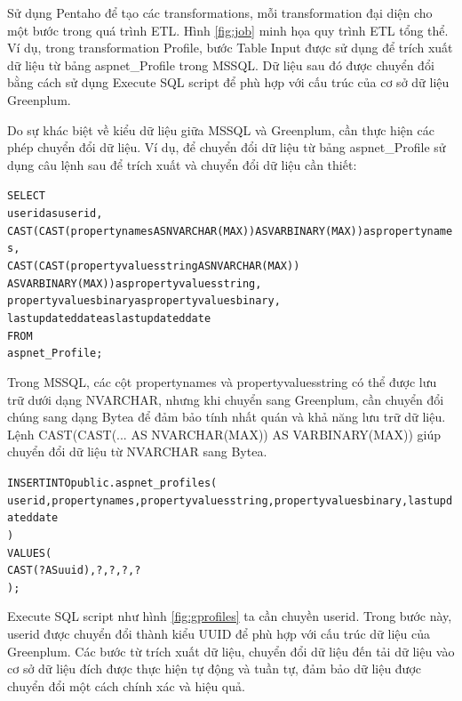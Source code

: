 \documentclass[14pt]{article}
\begin{document}
Sử dụng Pentaho để tạo các transformations, mỗi transformation đại diện cho một bước trong quá trình ETL. Hình \ref{fig:job} minh họa quy trình ETL tổng thể. Ví dụ, trong transformation Profile, bước Table Input được sử dụng để trích xuất dữ liệu từ bảng aspnet\_Profile trong MSSQL. Dữ liệu sau đó được chuyển đổi bằng cách sử dụng Execute SQL script để phù hợp với cấu trúc của cơ sở dữ liệu Greenplum.

Do sự khác biệt về kiểu dữ liệu giữa MSSQL và Greenplum, cần thực hiện các phép chuyển đổi dữ liệu. Ví dụ, để chuyển đổi dữ liệu từ bảng aspnet\_Profile sử dụng câu lệnh sau để trích xuất và chuyển đổi dữ liệu cần thiết:

\begin{mdframed}[backgroundcolor=white, linecolor=black, roundcorner=5pt]
\begin{alltt}
SELECT
    userid as userid,
    CAST(CAST(propertynames AS NVARCHAR(MAX)) AS VARBINARY(MAX)) as propertynames,
    CAST(CAST(propertyvaluesstring AS NVARCHAR(MAX)) 
    AS VARBINARY(MAX)) as propertyvaluesstring,
    propertyvaluesbinary as propertyvaluesbinary,
    lastupdateddate as lastupdateddate
FROM
    aspnet_Profile;
\end{alltt}
\end{mdframed}

Trong MSSQL, các cột propertynames và propertyvaluesstring có thể được lưu trữ dưới dạng NVARCHAR, nhưng khi chuyển sang Greenplum, cần chuyển đổi chúng sang dạng Bytea để đảm bảo tính nhất quán và khả năng lưu trữ dữ liệu. Lệnh CAST(CAST(... AS NVARCHAR(MAX)) AS VARBINARY(MAX)) giúp chuyển đổi dữ liệu từ NVARCHAR sang Bytea.

\begin{mdframed}[backgroundcolor=white, linecolor=black, roundcorner=5pt]
\begin{alltt}
INSERT INTO public.aspnet_profiles(
    userid, propertynames, propertyvaluesstring, propertyvaluesbinary, lastupdateddate
)
VALUES (
    CAST(? AS uuid), ?,?,?,?
);
\end{alltt}
\end{mdframed}

Execute SQL script như hình \ref{fig:gprofiles} ta cần chuyền userid. Trong bước này, userid được chuyển đổi thành kiểu UUID để phù hợp với cấu trúc dữ liệu của Greenplum. Các bước từ trích xuất dữ liệu, chuyển đổi dữ liệu đến tải dữ liệu vào cơ sở dữ liệu đích được thực hiện tự động và tuần tự, đảm bảo dữ liệu được chuyển đổi một cách chính xác và hiệu quả.
\end{document}
